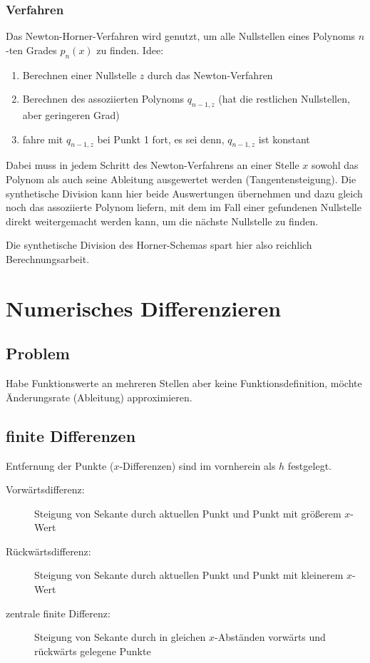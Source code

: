 \documentclass[a4paper, 12pt]{article}
\begin{document}
\subsubsection*{Verfahren}
Das Newton-Horner-Verfahren wird genutzt, um alle Nullstellen eines Polynoms \(n\)-ten Grades \(p_n(x)\) zu finden. Idee:
\begin{enumerate}
  \item Berechnen einer Nullstelle \(z\) durch das Newton-Verfahren
  \item Berechnen des assoziierten Polynoms \(q_{n-1,z}\) (hat die restlichen Nullstellen, aber geringeren Grad)
  \item fahre mit \(q_{n-1,z}\) bei Punkt 1 fort, es sei denn, \(q_{n-1,z}\) ist konstant
\end{enumerate}
Dabei muss in jedem Schritt des Newton-Verfahrens an einer Stelle \(x\) sowohl das Polynom als auch seine Ableitung ausgewertet werden (Tangentensteigung). Die synthetische Division kann hier beide Auswertungen übernehmen und dazu gleich noch das assoziierte Polynom liefern, mit dem im Fall einer gefundenen Nullstelle direkt weitergemacht werden kann, um die nächste Nullstelle zu finden.

Die synthetische Division des Horner-Schemas spart hier also reichlich Berechnungsarbeit.



\section{Numerisches Differenzieren}


\subsection{Problem}
Habe Funktionswerte an mehreren Stellen aber keine Funktionsdefinition, möchte Änderungsrate (Ableitung) approximieren.


\subsection{finite Differenzen}
Entfernung der Punkte (\(x\)-Differenzen) sind im vornherein als \(h\) festgelegt.
\begin{description}
  \item[Vorwärtsdifferenz:] Steigung von Sekante durch aktuellen Punkt und Punkt mit größerem \(x\)-Wert
  \item[Rückwärtsdifferenz:] Steigung von Sekante durch aktuellen Punkt und Punkt mit kleinerem \(x\)-Wert
  \item[zentrale finite Differenz:] Steigung von Sekante durch in gleichen \(x\)-Abständen vorwärts und rückwärts gelegene Punkte
\end{description}
\end{document}
